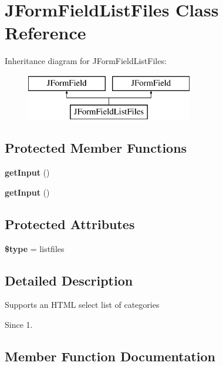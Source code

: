 \section{J\+Form\+Field\+List\+Files Class Reference}
\label{class_j_form_field_list_files}
Inheritance diagram for J\+Form\+Field\+List\+Files\+:\begin{figure}[H]
\begin{center}
\leavevmode
\includegraphics[height=2.000000cm]{class_j_form_field_list_files}
\end{center}
\end{figure}
\subsection*{Protected Member Functions}
\begin{DoxyCompactItemize}
\item 
\textbf{ get\+Input} ()
\item 
\textbf{ get\+Input} ()
\end{DoxyCompactItemize}
\subsection*{Protected Attributes}
\begin{DoxyCompactItemize}
\item 
\textbf{ \$type} = \textquotesingle{}listfiles\textquotesingle{}
\end{DoxyCompactItemize}


\subsection{Detailed Description}
Supports an H\+T\+ML select list of categories

\begin{DoxySince}{Since}
1. 
\end{DoxySince}


\subsection{Member Function Documentation}
\mbox{\label{class_j_form_field_list_files_a4380f30ae9202fa49ebd2439572f9cdb}} 
